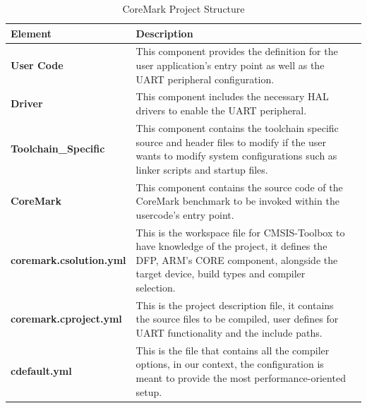 \begin{table}[H]
	\centering
   	\caption{CoreMark Project Structure}
   	\label{tab:cm_prj_struct}
   	\begin{tabularx}{\linewidth}{@{}>{\bfseries}l X X@{}}
    \toprule
    Element & Description \\
    \midrule
    User Code & This component provides the definition for the user application's entry point as well as the UART peripheral configuration. \\
    \midrule
    Driver & This component includes the necessary HAL drivers to enable the UART peripheral. \\
    \midrule
    Toolchain\_Specific & This component contains the toolchain specific source and header files to modify if the user wants to modify system configurations such as linker scripts and startup files. \\
    \midrule
    CoreMark & This component contains the source code of the CoreMark benchmark to be invoked within the usercode's entry point. \\
    \midrule
    coremark.csolution.yml & This is the workspace file for CMSIS-Toolbox to have knowledge of the project, it defines the DFP, ARM's CORE component, alongside the target device, build types and compiler selection. \\
    \midrule
    coremark.cproject.yml & This is the project description file, it contains the source files to be compiled, user defines for UART functionality and the include paths. \\
    \midrule
    cdefault.yml & This is the file that contains all the compiler options, in our context, the configuration is meant to provide the most performance-oriented setup. \\
    \bottomrule
   \end{tabularx}
\end{table}


